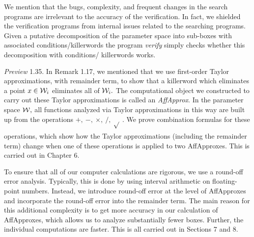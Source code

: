 We mention that the bugs, complexity, and 
frequent changes in the search programs are irrelevant to the 
accuracy of the verification.  In fact, we shielded the verification 
programs from internal issues related to the searching programs.  
Given a putative decomposition of the parameter space into 
sub-boxes with associated conditions/killerwords the program {\it verify} 
simply checks whether this decomposition with conditions/ 
killerwords works. 

 {\it Preview} {\rm 1.35}.  In Remark 1.17, we mentioned that we use first-order Taylor approximations, with remainder term, to show that
a killerword which eliminates a point $x\in {\cal W}_i$ eliminates all of ${\cal W}_i.$  
The computational object we constructed to carry out these Taylor approximations is called an {\it AffApprox}.
In the parameter space ${\cal W},$ all functions analyzed via Taylor
approximations in this way are built up from the
operations $ +,\ -,\ \times, \  /,\ \sqrt{}_{\phantom{|}} .$  We prove combination
formulas for these operations, which show how the Taylor approximations
(including the remainder term) change when one of these operations is
applied to two AffApproxes.   This is carried out in Chapter 6. 

To ensure that all of our computer calculations are rigorous, we use a round-off error analysis.  Typically, this is done by using interval
arithmetic on floating-point numbers. 
Instead, we introduce
round-off error at the level of AffApproxes and
incorporate the round-off error into the remainder term.  
The main reason for this additional complexity is to get
more accuracy in our calculation of AffApproxes, 
which allows us to analyze substantially fewer boxes.
Further, the individual computations are faster.
This is all
carried out in Sections 7 and 8.
 

 





